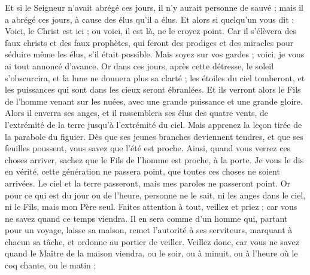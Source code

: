 \begin{multicols}{2}
Et si le Seigneur n'avait abrégé ces jours, il n'y aurait personne de sauvé ; mais il a abrégé ces jours, à cause des élus qu'il a élus.
Et alors si quelqu'un vous dit : Voici, le Christ est ici ; ou voici, il est là, ne le croyez point.
Car il s'élèvera des faux christs et des faux prophètes, qui feront des prodiges et des miracles pour séduire même les élus, s'il était possible.
Mais soyez sur vos gardes ; voici, je vous ai tout annoncé d'avance.
Or dans ces jours, après cette détresse, le soleil s'obscurcira, et la lune ne donnera plus sa clarté ;
les étoiles du ciel tomberont, et les puissances qui sont dans les cieux seront ébranlées.
Et ils verront alors le Fils de l'homme venant sur les nuées, avec une grande puissance et une grande gloire.
Alors il enverra ses anges, et il rassemblera ses élus des quatre vents, de l'extrémité de la terre jusqu'à l'extrémité du ciel.
Mais apprenez la leçon tirée de la parabole du figuier. Dès que ses jeunes branches deviennent tendres, et que ses feuilles poussent, vous savez que l'été est proche.
Ainsi, quand vous verrez ces choses arriver, sachez que le Fils de l'homme est proche, à la porte.
Je vous le dis en vérité, cette génération ne passera point, que toutes ces choses ne soient arrivées.
Le ciel et la terre passeront, mais mes paroles ne passeront point.
Or pour ce qui est du jour ou de l'heure, personne ne le sait, ni les anges dans le ciel, ni le Fils, mais mon Père seul.
Faites attention à tout, veillez et priez ; car vous ne savez quand ce temps viendra.
Il en sera comme d'un homme qui, partant pour un voyage, laisse sa maison, remet l'autorité à ses serviteurs, marquant à chacun sa tâche, et ordonne au portier de veiller.
Veillez donc, car vous ne savez quand le Maître de la maison viendra, ou le soir, ou à minuit, ou à l'heure où le coq chante, ou le matin ;

\end{multicols}
